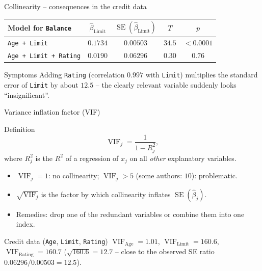 \documentclass[aspectratio=169,11pt]{beamer}
\begin{document}
\begin{frame}{Collinearity -- consequences in the credit data}
  \begin{center}
    \renewcommand{\arraystretch}{1.3}
    \begin{tabular}{lcccc}
      \toprule
      Model for \texttt{Balance} & $\hat\beta_{\text{Limit}}$ & $\operatorname{SE}(\hat\beta_{\text{Limit}})$ & $T$ & $p$\\
      \midrule
      \texttt{Age + Limit} & $0.1734$ & $0.00503$ & $34.5$ & $<0.0001$\\
      \texttt{Age + Limit + Rating} & $0.0190$ & $0.06296$ & $0.30$ & $0.76$\\
      \bottomrule
    \end{tabular}
  \end{center}
  \begin{alertblock}{Symptoms}
    Adding \texttt{Rating} (correlation $0.997$ with \texttt{Limit})
    multiplies the standard error of \texttt{Limit} by about $12.5$ -- the
    clearly relevant variable suddenly looks ``insignificant''.
  \end{alertblock}
\end{frame}

\begin{frame}{Variance inflation factor (VIF)}
  \begin{block}{Definition}
    \[
      \operatorname{VIF}_j=\frac{1}{1-R_j^2},
    \]
    where $R_j^2$ is the $R^2$ of a regression of $x_j$ on all
    \emph{other} explanatory variables.
  \end{block}
  \begin{itemize}\setlength{\itemsep}{3pt}
    \item $\operatorname{VIF}_j=1$: no collinearity; $\operatorname{VIF}_j>5$ (some
          authors: $10$): problematic.
    \item $\sqrt{\operatorname{VIF}_j}$ is the factor by which collinearity
          inflates $\operatorname{SE}(\hat\beta_j)$.
    \item Remedies: drop one of the redundant variables or combine them into
          one index.
  \end{itemize}
  \begin{exampleblock}{Credit data (\texttt{Age}, \texttt{Limit}, \texttt{Rating})}
    $\operatorname{VIF}_{\text{Age}}=1.01$, \quad
    $\operatorname{VIF}_{\text{Limit}}=160.6$, \quad
    $\operatorname{VIF}_{\text{Rating}}=160.7$ \quad
    ($\sqrt{160.6}=12.7$ -- close to the observed SE ratio
    $0.06296/0.00503=12.5$).
  \end{exampleblock}
\end{frame}
\end{document}
